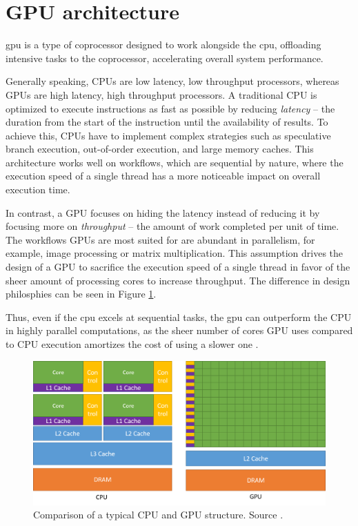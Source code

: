 \section {GPU architecture}

\acrfull{gpu} is a type of coprocessor designed to work alongside the \acrshort{cpu}, offloading intensive tasks to the coprocessor, accelerating overall system performance.

Generally speaking, CPUs are low latency, low throughput processors, whereas GPUs are high latency, high throughput processors. A traditional CPU is optimized to execute instructions as fast as possible by reducing \textit{latency} -- the duration from the start of the instruction until the availability of results. To achieve this, CPUs have to implement complex strategies such as speculative branch execution, out-of-order execution, and large memory caches. This architecture works well on workflows, which are sequential by nature, where the execution speed of a single thread has a more noticeable impact on overall execution time.

In contrast, a GPU focuses on hiding the latency instead of reducing it by focusing more on \textit{throughput} -- the amount of work completed per unit of time. The workflows GPUs are most suited for are abundant in parallelism, for example, image processing or matrix multiplication. This assumption drives the design of a GPU to sacrifice the execution speed of a single thread in favor of the sheer amount of processing cores to increase throughput. The difference in design philosphies can be seen in Figure \ref{figure:cpu-vs-gpu}.

Thus, even if the \acrshort{cpu} excels at sequential tasks, the \acrshort{gpu} can outperform the CPU in highly parallel computations, as the sheer number of cores GPU uses compared to CPU execution amortizes the cost of using a slower one \cite{cudaprog}.

\begin{figure}
  \centering
  \includegraphics[width=\textwidth]{components/assets/cpu-vs-gpu.png}
  \caption{Comparison of a typical CPU and GPU structure. Source \cite{cudaprog}.}
  \label{figure:cpu-vs-gpu}
\end{figure}

